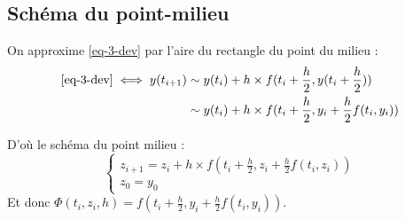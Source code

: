 	\subsection{Schéma du point-milieu}

		On approxime \eqref{eq-3-dev} par l'aire du rectangle du point du milieu :
		\begin{align*}
			\eqref{eq-3-dev} \iff
			y(t_{i+1}) 	&\sim y(t_i) + h\times f(t_i +\frac{h}{2}, y(t_i +\frac{h}{2}))	\\
						&\sim y(t_i) + h\times f(t_i +\frac{h}{2}, y_i + \frac{h}{2}f(t_i,y_i))
		\end{align*}

		D'où le schéma du point milieu :
		\begin{equation}
			\label{eq-3-pointMilieu}
			\begin{cases}
				z_{i+1} = z_i + h\times f(t_i +\frac{h}{2}, z_i + \frac{h}{2}f(t_i,z_i))		\\
				z_0 = y_0
			\end{cases}
		\end{equation}
		Et donc $\Phi(t_i,z_i,h) = f(t_i +\frac{h}{2}, y_i + \frac{h}{2}f(t_i,y_i))$.

		\bigskip

